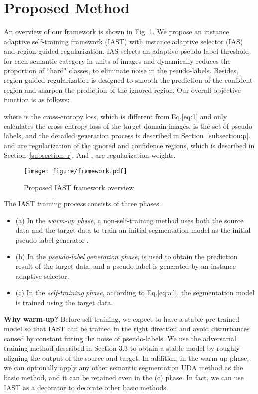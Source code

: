 \documentclass[runningheads]{llncs}
\begin{document}
 
\section{Proposed Method}


An overview of our framework is shown in Fig. \ref{fig:framework}. We propose an instance adaptive self-training framework (IAST) with instance adaptive selector (IAS) and region-guided regularization. IAS selects an adaptive pseudo-label threshold for each semantic category in units of images and dynamically reduces the proportion of ``hard" classes, to eliminate noise in the pseudo-labels. Besides, region-guided regularization is designed to smooth the prediction of the confident region and sharpen the prediction of the ignored region. Our overall objective function is as follows:


where  is the cross-entropy loss, which is different from Eq.\eqref{eq:1} and only calculates the cross-entropy loss of the target domain images.  is the set of pseudo-labels, and the detailed generation process is described in Section~\ref{subsection:p}.  and  are regularization of the ignored and confidence regions, which is described in Section~\ref{subsection: r}. And ,  are regularization weights.

\begin{figure}[ht] 
    \centering 
    \texttt{[image: figure/framework.pdf]} 
    \caption{Proposed IAST framework overview}
    \label{fig:framework} 
\end{figure}

The IAST training process consists of three phases.
\begin{itemize}
    \item (a) In the \emph{warm-up phase}, a non-self-training method uses both the source data and the target data to train an initial segmentation model   as the initial pseudo-label generator .
    \item (b) In the \emph{pseudo-label generation phase},  is used to obtain the prediction result of the target data, and a pseudo-label is generated by an instance adaptive selector.
    \item (c) In the \emph{self-training phase}, according to Eq.\eqref{eq:all}, the segmentation model  is trained using the target data.
\end{itemize}

\noindent\textbf{Why warm-up?} Before self-training, we expect to have a stable pre-trained model so that IAST can be trained in the right direction and avoid disturbances caused by constant fitting the noise of pseudo-labels. We use the adversarial training method described in Section 3.3 to obtain a stable model by roughly aligning the output of the source and target. In addition, in the warm-up phase, we can optionally apply any other semantic segmentation UDA method as the basic method, and it can be retained even in the (c) phase. In fact, we can use IAST as a decorator to decorate other basic methods.\\
\end{document}
